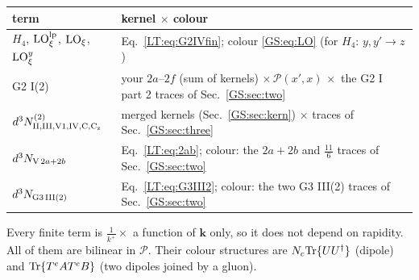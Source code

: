 \documentclass[10pt]{article}
\numberwithin{equation}{section}
\newcommand{\LO}{{\rm LO}}
\newcommand{\PP}{\mathcal P}
\newcommand{\Tr}{{\rm Tr}}
\newcommand{\Ud}{U^\dagger}
\begin{document}
\begin{center}\small
\begin{tabular}{@{}p{}p{}@{}}\toprule
term & kernel $\times$ colour\\\midrule
$H_4$, $\LO^{\rm lp}_\xi$, $\LO_\xi$, $\LO^y_\xi$ & Eq.~\eqref{LT:eq:G2IVfin}; colour \eqref{GS:eq:LO} (for $H_4$: $y,y'\to z$)\\
G2 I(2) & your $2a$--$2f$ (sum of kernels) $\times\,\PP(x',x)\,\times$ the G2 I part 2 traces of Sec.~\ref{GS:sec:two}\\
$d^3N^{(2)}_{\rm II,III,V1,IV,C,C_z}$ & merged kernels (Sec.~\ref{GS:sec:kern}) $\times$ traces of Sec.~\ref{GS:sec:three}\\
$d^3N_{{\rm V}\,2a+2b}$ & Eq.~\eqref{LT:eq:2ab}; colour: the $2a+2b$ and $\frac{11}{6}$ traces of Sec.~\ref{GS:sec:two}\\
$d^3N_{\rm G3\,III(2)}$ & Eq.~\eqref{LT:eq:G3III2}; colour: the two G3 III(2) traces of Sec.~\ref{GS:sec:two}\\\bottomrule
\end{tabular}
\end{center}
Every finite term is $\frac{1}{k^+}\times$ a function of $\mathbf k$ only, so it does not depend on rapidity. All of them are bilinear in $\PP$. Their colour structures are $N_c\Tr\{U\Ud\}$ (dipole) and $\Tr\{T^eAT^eB\}$ (two dipoles joined by a gluon).

\end{document}
